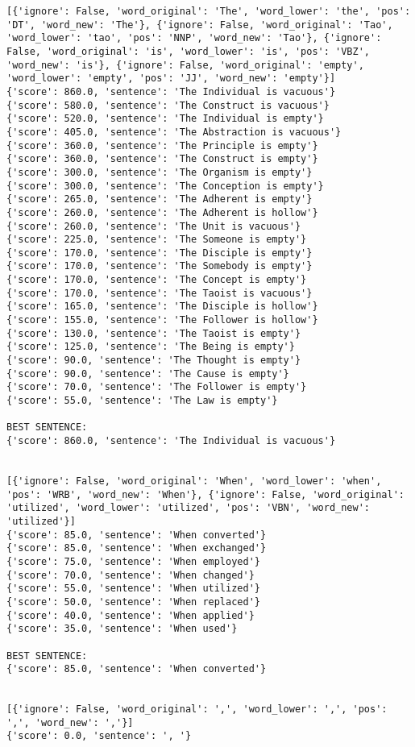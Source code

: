 \documentclass[12pt,a4paper,oneside]{book}
\begin{document}
\begin{verbatim}
[{'ignore': False, 'word_original': 'The', 'word_lower': 'the', 'pos': 'DT', 'word_new': 'The'}, {'ignore': False, 'word_original': 'Tao', 'word_lower': 'tao', 'pos': 'NNP', 'word_new': 'Tao'}, {'ignore': False, 'word_original': 'is', 'word_lower': 'is', 'pos': 'VBZ', 'word_new': 'is'}, {'ignore': False, 'word_original': 'empty', 'word_lower': 'empty', 'pos': 'JJ', 'word_new': 'empty'}]
{'score': 860.0, 'sentence': 'The Individual is vacuous'}
{'score': 580.0, 'sentence': 'The Construct is vacuous'}
{'score': 520.0, 'sentence': 'The Individual is empty'}
{'score': 405.0, 'sentence': 'The Abstraction is vacuous'}
{'score': 360.0, 'sentence': 'The Principle is empty'}
{'score': 360.0, 'sentence': 'The Construct is empty'}
{'score': 300.0, 'sentence': 'The Organism is empty'}
{'score': 300.0, 'sentence': 'The Conception is empty'}
{'score': 265.0, 'sentence': 'The Adherent is empty'}
{'score': 260.0, 'sentence': 'The Adherent is hollow'}
{'score': 260.0, 'sentence': 'The Unit is vacuous'}
{'score': 225.0, 'sentence': 'The Someone is empty'}
{'score': 170.0, 'sentence': 'The Disciple is empty'}
{'score': 170.0, 'sentence': 'The Somebody is empty'}
{'score': 170.0, 'sentence': 'The Concept is empty'}
{'score': 170.0, 'sentence': 'The Taoist is vacuous'}
{'score': 165.0, 'sentence': 'The Disciple is hollow'}
{'score': 155.0, 'sentence': 'The Follower is hollow'}
{'score': 130.0, 'sentence': 'The Taoist is empty'}
{'score': 125.0, 'sentence': 'The Being is empty'}
{'score': 90.0, 'sentence': 'The Thought is empty'}
{'score': 90.0, 'sentence': 'The Cause is empty'}
{'score': 70.0, 'sentence': 'The Follower is empty'}
{'score': 55.0, 'sentence': 'The Law is empty'}

BEST SENTENCE:
{'score': 860.0, 'sentence': 'The Individual is vacuous'}


[{'ignore': False, 'word_original': 'When', 'word_lower': 'when', 'pos': 'WRB', 'word_new': 'When'}, {'ignore': False, 'word_original': 'utilized', 'word_lower': 'utilized', 'pos': 'VBN', 'word_new': 'utilized'}]
{'score': 85.0, 'sentence': 'When converted'}
{'score': 85.0, 'sentence': 'When exchanged'}
{'score': 75.0, 'sentence': 'When employed'}
{'score': 70.0, 'sentence': 'When changed'}
{'score': 55.0, 'sentence': 'When utilized'}
{'score': 50.0, 'sentence': 'When replaced'}
{'score': 40.0, 'sentence': 'When applied'}
{'score': 35.0, 'sentence': 'When used'}

BEST SENTENCE:
{'score': 85.0, 'sentence': 'When converted'}


[{'ignore': False, 'word_original': ',', 'word_lower': ',', 'pos': ',', 'word_new': ','}]
{'score': 0.0, 'sentence': ', '}


\end{verbatim}
\end{document}
